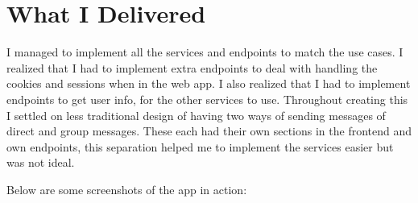 \documentclass[12pt]{Article}
\begin{document}
\section{What I Delivered}
I managed to implement all the services and endpoints to match the use cases.
I realized that I had to implement extra endpoints to deal with handling the cookies and sessions when in the web app.
I also realized that I had to implement endpoints to get user info, for the other services to use.
Throughout creating this I settled on less traditional design of having two ways of sending messages of direct and group messages.
These each had their own sections in the frontend and own endpoints, this separation helped me to implement the services easier but was not ideal.

Below are some screenshots of the app in action:
\end{document}
